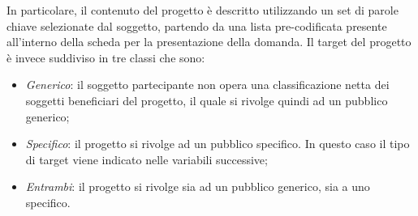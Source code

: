 \documentclass[a4paper,10pt]{scrartcl}
\begin{document}
In particolare, il contenuto del progetto è descritto utilizzando un set di parole chiave selezionate dal soggetto, partendo da una lista pre-codificata presente all’interno della scheda per la presentazione della domanda. Il target del progetto è invece suddiviso in tre classi che sono:
\begin{itemize}
\item \textit{Generico}: il soggetto partecipante non opera una classificazione netta dei soggetti beneficiari del progetto, il quale si rivolge quindi ad un pubblico generico;
\item \textit{Specifico}: il progetto si rivolge ad un pubblico specifico. In questo caso il tipo di target viene indicato nelle variabili successive;
\item \textit{Entrambi}: il progetto si rivolge sia ad un pubblico generico, sia a uno specifico.
\end{itemize}
\end{document}
